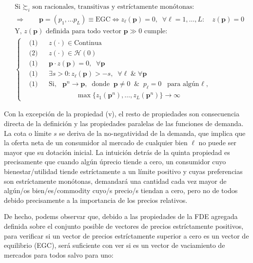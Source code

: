 \documentclass[10pt,a4paper]{article}
\begin{document}
$$\begin{aligned}
    &\text{Si $\succsim_i$ son racionales, transitivas y estríctamente monótonas:}\\[1em]
    &\Longrightarrow\qquad \boxed{\mathbf p=(p_1,\dots p_L)\equiv \text{EGC}\iff z_\ell(\mathbf p)=0,\;\;\forall\ell=1,\dots, L:\quad z(\mathbf p)=0}\\[1em]
    &\text{Y, $z(\mathbf p)$ definida para todo vector $\mathbf p\gg 0$ cumple:}\\[0.5em]
    &\left\{\begin{aligned}
        &\text{(1)}&&z(\cdot )\in\text{Continua}\\
        &\text{(2)}&&z(\cdot )\in\mathcal H(0)\\
        &\text{(1)}&&\mathbf p\cdot z(\mathbf p)=0,\;\;\forall \mathbf p\\
        &\text{(1)}&&\exists s>0:z_\ell(\mathbf p)>-s,\;\;\forall \ell\;\&\;\forall\mathbf p\\
        &\text{(1)}&&\text{Si, }\;\;\mathbf p^n\to \mathbf p,\;\;\text{donde}\;\;\mathbf p\neq0\;\;\&\;\;p_\ell=0\;\;\text{para algún $\ell$},\\
        &&&\hspace{4em}\max\{z_1(\mathbf p^n),\dots ,z_L(\mathbf p^n)\}\to \infty
    \end{aligned}\right.
\end{aligned}$$

Con la excepción de la propiedad (v), el resto de propiedades son consecuencia directa de la definición y las propiedades paralelas de las funciones de demanda. La cota o límite $s$ se deriva de la no-negatividad de la demanda, que implica que la oferta neta de un consumidor al mercado de cualquier bien $\ell$ no puede ser mayor que su dotación inicial. La intuición detrás de la quinta propiedad es precisamente que cuando algún úprecio tiende a cero, un consumidor cuyo bienestar/utilidad tiende estríctamente a un límite positivo y cuyas preferencias son estríctamente monótonas, demandará una cantidad cada vez mayor de algún/os bien/es/commodity cuyo/s precio/s tiendan a cero, pero no de todos debido precisamente a la importancia de los precios relativos. 

De hecho, podems observar que, debido a las propiedades de la FDE agregada definida sobre el conjunto posible de vectores de precios estríctamente positivos, para verificar si un vector de precios estríctamente superior a cero es un vector de equilibrio (EGC), será suficiente con ver si es un vector de vaciamiento de mercados para todos salvo para uno:
\end{document}

